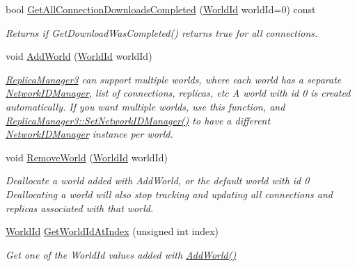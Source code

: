 \begin{DoxyCompactItemize}
bool \hyperlink{class_rak_net_1_1_replica_manager3_adc5f625a0e279e68062527526b8db2db}{Get\-All\-Connection\-Downloads\-Completed} (\hyperlink{group___r_e_p_l_i_c_a___m_a_n_a_g_e_r___g_r_o_u_p3_ga44b59af8e882248f61aa41d8ace38bf7}{World\-Id} world\-Id=0) const 
\begin{DoxyCompactList}\small\item\em Returns if Get\-Download\-Was\-Completed() returns true for all connections. \end{DoxyCompactList}\item 
void \hyperlink{class_rak_net_1_1_replica_manager3_aa0c70560e7dd9bda8b50ff3909f78248}{Add\-World} (\hyperlink{group___r_e_p_l_i_c_a___m_a_n_a_g_e_r___g_r_o_u_p3_ga44b59af8e882248f61aa41d8ace38bf7}{World\-Id} world\-Id)
\begin{DoxyCompactList}\small\item\em \hyperlink{class_rak_net_1_1_replica_manager3}{Replica\-Manager3} can support multiple worlds, where each world has a separate \hyperlink{class_rak_net_1_1_network_i_d_manager}{Network\-I\-D\-Manager}, list of connections, replicas, etc A world with id 0 is created automatically. If you want multiple worlds, use this function, and \hyperlink{class_rak_net_1_1_replica_manager3_a916816210240e1f1d38478cea311999e}{Replica\-Manager3\-::\-Set\-Network\-I\-D\-Manager()} to have a different \hyperlink{class_rak_net_1_1_network_i_d_manager}{Network\-I\-D\-Manager} instance per world. \end{DoxyCompactList}\item 
void \hyperlink{class_rak_net_1_1_replica_manager3_a18b55ef2c0606b05896e2b4a5103ab21}{Remove\-World} (\hyperlink{group___r_e_p_l_i_c_a___m_a_n_a_g_e_r___g_r_o_u_p3_ga44b59af8e882248f61aa41d8ace38bf7}{World\-Id} world\-Id)
\begin{DoxyCompactList}\small\item\em Deallocate a world added with Add\-World, or the default world with id 0 Deallocating a world will also stop tracking and updating all connections and replicas associated with that world. \end{DoxyCompactList}\item 
\hyperlink{group___r_e_p_l_i_c_a___m_a_n_a_g_e_r___g_r_o_u_p3_ga44b59af8e882248f61aa41d8ace38bf7}{World\-Id} \hyperlink{class_rak_net_1_1_replica_manager3_ad1db1ccc77de2ca4fc324405ddac63a6}{Get\-World\-Id\-At\-Index} (unsigned int index)
\begin{DoxyCompactList}\small\item\em Get one of the World\-Id values added with \hyperlink{class_rak_net_1_1_replica_manager3_aa0c70560e7dd9bda8b50ff3909f78248}{Add\-World()} \end{DoxyCompactList}\item 

\end{DoxyCompactItemize}
